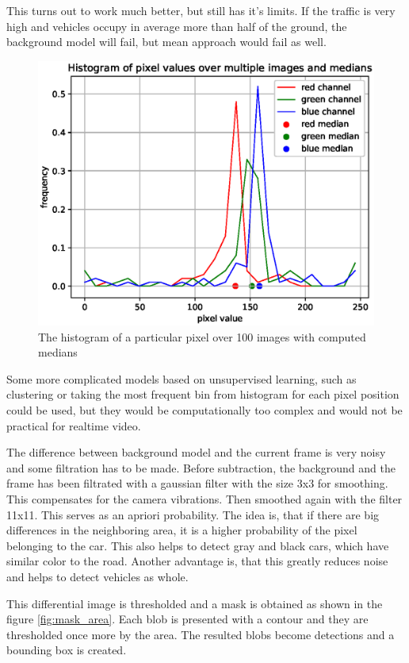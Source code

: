 \documentclass[a4paper,12pt,titlepage]{article}
\numberwithin{figure}{section}
\begin{document}
This turns out to work much better, but still has it's limits. If the traffic is very high and vehicles occupy in average more than half of the ground, the background model will fail, but mean approach would fail as well. 

\begin{figure}[h]
\centering
\includegraphics[width=1\linewidth]{fig/pixel_hist.eps}
\caption{The histogram of a particular pixel over 100 images with computed medians}
\label{fig:pixel_hist}
\end{figure}

Some more complicated models based on unsupervised learning, such as clustering or taking the most frequent bin from histogram for each pixel position could be used, but they would be computationally too complex and would not be practical for realtime video.

The difference between background model and the current frame is very noisy and some filtration has to be made. Before subtraction, the background and the frame has been filtrated with a gaussian filter with the size 3x3 for smoothing. This compensates for the camera vibrations. Then smoothed again with the filter 11x11. This serves as an apriori probability. The idea is, that if there are big differences in the neighboring area, it is a higher probability of the pixel belonging to the car. This also helps to detect gray and black cars, which have similar color to the road. Another advantage is, that this greatly reduces noise and helps to detect vehicles as whole.

This differential image is thresholded and a mask is obtained as shown in the figure \ref{fig:mask_area}. Each blob is presented with a contour and they are thresholded once more by the area. The resulted blobs become detections and a bounding box is created.
\end{document}
